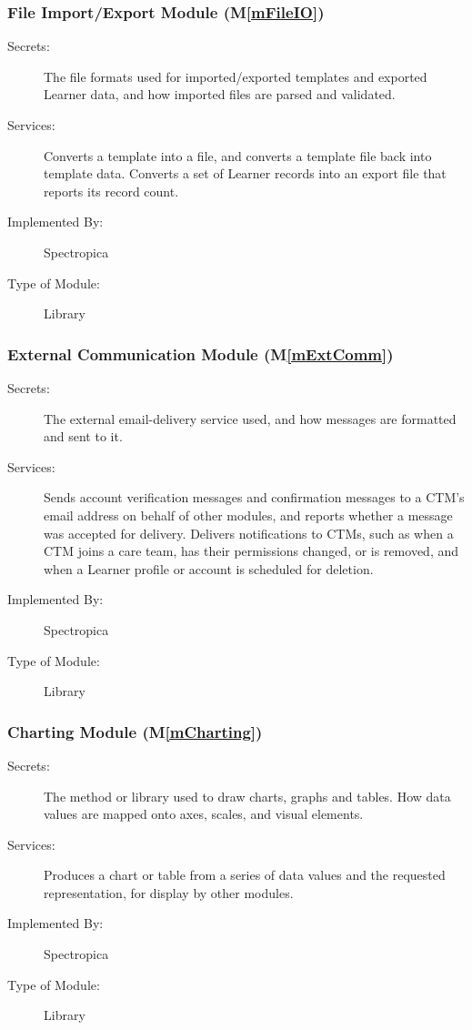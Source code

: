 \documentclass[12pt, titlepage]{article}
\newcommand{\mref}[1]{M\ref{#1}}
\begin{document}
\subsubsection{File Import/Export Module (\mref{mFileIO})}

\begin{description}
\item[Secrets:] The file formats used for imported/exported templates and exported Learner data, and how imported files are parsed and validated.
\item[Services:] Converts a template into a file, and converts a template file back into template data. Converts a set of Learner records into an export file that reports its record count.
\item[Implemented By:] Spectropica
\item[Type of Module:] Library
\end{description}

\subsubsection{External Communication Module (\mref{mExtComm})}

\begin{description}
\item[Secrets:] The external email-delivery service used, and how messages are formatted and sent to it.
\item[Services:] Sends account verification messages and confirmation messages to a CTM's email address on behalf of other modules, and reports whether a message was accepted for delivery. Delivers notifications to CTMs, such as when a CTM joins a care team, has their permissions changed, or is removed, and when a Learner profile or account is scheduled for deletion.
\item[Implemented By:] Spectropica
\item[Type of Module:] Library
\end{description}

\subsubsection{Charting Module (\mref{mCharting})}

\begin{description}
\item[Secrets:] The method or library used to draw charts, graphs and tables. How data values are mapped onto axes, scales, and visual elements.
\item[Services:] Produces a chart or table from a series of data values and the requested representation, for display by other modules.
\item[Implemented By:] Spectropica
\item[Type of Module:] Library
\end{description}
\end{document}
